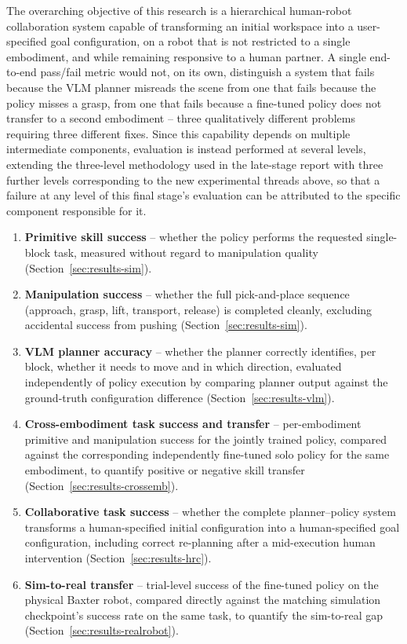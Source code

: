 \documentclass[12pt]{article}
\begin{document}
The overarching objective of this research is a hierarchical human-robot collaboration system capable of transforming an initial workspace into a user-specified goal configuration, on a robot that is not restricted to a single embodiment, and while remaining responsive to a human partner. A single end-to-end pass/fail metric would not, on its own, distinguish a system that fails because the VLM planner misreads the scene from one that fails because the policy misses a grasp, from one that fails because a fine-tuned policy does not transfer to a second embodiment -- three qualitatively different problems requiring three different fixes. Since this capability depends on multiple intermediate components, evaluation is instead performed at several levels, extending the three-level methodology used in the late-stage report with three further levels corresponding to the new experimental threads above, so that a failure at any level of this final stage's evaluation can be attributed to the specific component responsible for it.

\begin{enumerate}[nosep]
\item \textbf{Primitive skill success} -- whether the policy performs the requested single-block task, measured without regard to manipulation quality (Section~\ref{sec:results-sim}).
\item \textbf{Manipulation success} -- whether the full pick-and-place sequence (approach, grasp, lift, transport, release) is completed cleanly, excluding accidental success from pushing (Section~\ref{sec:results-sim}).
\item \textbf{VLM planner accuracy} -- whether the planner correctly identifies, per block, whether it needs to move and in which direction, evaluated independently of policy execution by comparing planner output against the ground-truth configuration difference (Section~\ref{sec:results-vlm}).
\item \textbf{Cross-embodiment task success and transfer} -- per-embodiment primitive and manipulation success for the jointly trained policy, compared against the corresponding independently fine-tuned solo policy for the same embodiment, to quantify positive or negative skill transfer (Section~\ref{sec:results-crossemb}).
\item \textbf{Collaborative task success} -- whether the complete planner--policy system transforms a human-specified initial configuration into a human-specified goal configuration, including correct re-planning after a mid-execution human intervention (Section~\ref{sec:results-hrc}).
\item \textbf{Sim-to-real transfer} -- trial-level success of the fine-tuned policy on the physical Baxter robot, compared directly against the matching simulation checkpoint's success rate on the same task, to quantify the sim-to-real gap (Section~\ref{sec:results-realrobot}).
\end{enumerate}
\end{document}

